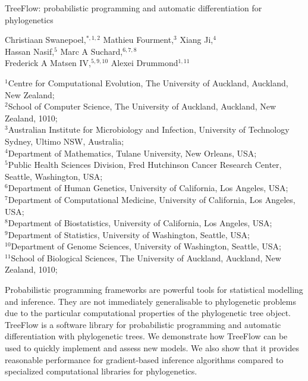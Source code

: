 
TreeFlow: probabilistic programming and automatic differentiation for phylogenetics

Christiaan Swanepoel,$^{\ast, 1, 2}$
Mathieu Fourment,$^{3}$
Xiang Ji,$^{4}$\\
Hassan Nasif,$^{5}$
Marc A Suchard,$^{6,7,8}$\\
Frederick A Matsen IV,$^{5,9,10}$
Alexei Drummond$^{1,11}$

${^1}$Centre for Computational Evolution, The University of Auckland, Auckland, New Zealand;\\
$^{2}$School of Computer Science, The University of Auckland, Auckland, New Zealand, 1010;\\
$^{3}$Australian Institute for Microbiology and Infection, University of Technology Sydney, Ultimo NSW, Australia;\\
$^{4}$Department of Mathematics, Tulane University, New Orleans, USA;\\
$^{5}$Public Health Sciences Division, Fred Hutchinson Cancer Research Center, Seattle, Washington, USA;\\
$^{6}$Department of Human Genetics, University of California, Los Angeles, USA;\\
$^{7}$Department of Computational Medicine, University of California, Los Angeles, USA;\\
$^{8}$Department of Biostatistics, University of California, Los Angeles, USA;\\
$^{9}$Department of Statistics, University of Washington, Seattle, USA;\\
$^{10}$Department of Genome Sciences, University of Washington, Seattle, USA;\\
$^{11}$School of Biological Sciences, The University of Auckland, Auckland, New Zealand, 1010;\\

\usepackage{booktabs}
\usepackage[outputdir=]{minted}
\usepackage{multirow}
\usepackage{setspace}
\usepackage[T1]{fontenc}

Probabilistic programming frameworks are powerful tools for statistical modelling and inference. They are not immediately generalisable to phylogenetic problems due to the particular computational properties of the phylogenetic tree object. TreeFlow is a software library for probabilistic programming and automatic differentiation with phylogenetic trees. We demonstrate how TreeFlow can be used to quickly implement and assess new models. We also show that it provides reasonable performance for gradient-based inference algorithms compared to specialized computational libraries for phylogenetics.

